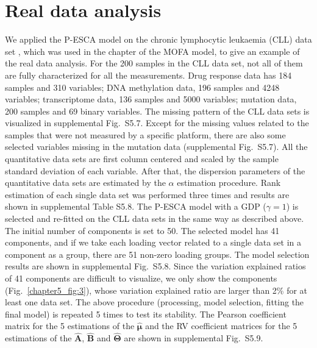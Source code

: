 \section{Real data analysis}
We applied the P-ESCA model on the chronic lymphocytic leukaemia (CLL) data set \cite{dietrich2018drug,argelaguet2018multi}, which was used in the chapter of the MOFA model, to give an example of the real data analysis. For the 200 samples in the CLL data set, not all of them are fully characterized for all the measurements. Drug response data has 184 samples and 310 variables; DNA methylation data, 196 samples and 4248 variables; transcriptome data, 136 samples and 5000 variables; mutation data, 200 samples and 69 binary variables. The missing pattern of the CLL data sets is visualized in supplemental Fig.~S5.7. Except for the missing values related to the samples that were not measured by a specific platform, there are also some selected variables missing in the mutation data (supplemental Fig.~S5.7). All the quantitative data sets are first column centered and scaled by the sample standard deviation of each variable. After that, the dispersion parameters of the quantitative data sets are estimated by the $\alpha$ estimation procedure. Rank estimation of each single data set was performed three times and results are shown in supplemental Table S5.8. The P-ESCA model with a GDP ($\gamma=1$) is selected and re-fitted on the CLL data sets in the same way as described above. The initial number of components is set to 50. The selected model has 41 components, and if we take each loading vector related to a single data set in a component as a group, there are 51 non-zero loading groups. The model selection results are shown in supplemental Fig.~S5.8. Since the variation explained ratios of 41 components are difficult to visualize, we only show the components (Fig.~\ref{chapter5_fig:3}), whose variation explained ratio are larger than 2\% for at least one data set. The above procedure (processing, model selection, fitting the final model) is repeated 5 times to test its stability. The Pearson coefficient matrix for the 5 estimations of the $\hat{\bm{\mu}}$ and the RV coefficient matrices for the 5 estimations of the $\hat{\mathbf{A}}$, $\hat{\mathbf{B}}$ and $\hat{\mathbf{\Theta}}$ are shown in supplemental Fig.~S5.9.

